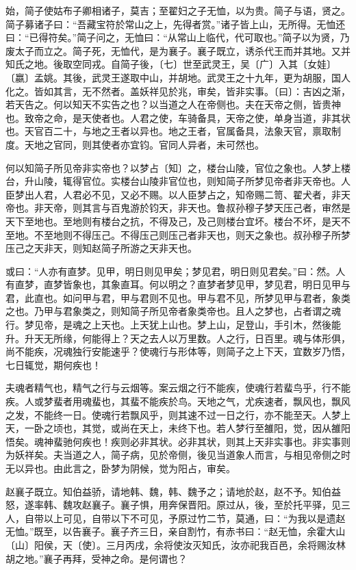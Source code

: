 \documentclass[]{article}
\begin{document}
始，简子使姑布子卿相诸子，莫吉；至翟妇之子无恤，以为贵。简子与语，贤之。简子募诸子曰：``吾藏宝符於常山之上，先得者赏。''诸子皆上山，无所得。无恤还曰：``已得符矣。''简子问之，无恤曰：``从常山上临代，代可取也。''简子以为贤，乃废太子而立之。简子死，无恤代，是为襄子。襄子既立，诱杀代王而并其地。又并知氏之地。後取空同戎。自简子後，〔七〕世至武灵王，吴〔广〕入其〔女娃〕〔嬴〕孟姚。其後，武灵王遂取中山，并胡地。武灵王之十九年，更为胡服，国人化之。皆如其言，无不然者。盖妖祥见於兆，审矣，皆非实事。〔曰〕：吉凶之渐，若天告之。何以知天不实告之也？以当道之人在帝侧也。夫在天帝之侧，皆贵神也。致帝之命，是天使者也。人君之使，车骑备具，天帝之使，单身当道，非其状也。天官百二十，与地之王者以异也。地之王者，官属备具，法象天官，禀取制度。天地之官同，则其使者亦宜钧。官同人异者，未可然也。

何以知简子所见帝非实帝也？以梦占〔知〕之，楼台山陵，官位之象也。人梦上楼台，升山陵，辄得官位。实楼台山陵非官位也，则知简子所梦见帝者非天帝也。人臣梦出人君，人君必不见，又必不赐。以人臣梦占之，知帝赐二笥、翟犬者，非天帝也。非天帝，则其言与百鬼游於钧天，非天也。鲁叔孙穆子梦天压己者，审然是天下至地也。至地则有楼台之抗，不得及己，及己则楼台宜坏。楼台不坏，是天不至地。不至地则不得压己。不得压己则压己者非天也，则天之象也。叔孙穆子所梦压己之天非天，则知赵简子所游之天非天也。

或曰：``人亦有直梦。见甲，明日则见甲矣；梦见君，明日则见君矣。''曰：然。人有直梦，直梦皆象也，其象直耳。何以明之？直梦者梦见甲，梦见君，明日见甲与君，此直也。如问甲与君，甲与君则不见也。甲与君不见，所梦见甲与君者，象类之也。乃甲与君象类之，则知简子所见帝者象类帝也。且人之梦也，占者谓之魂行。梦见帝，是魂之上天也。上天犹上山也。梦上山，足登山，手引木，然後能升。升天无所缘，何能得上？天之去人以万里数。人之行，日百里。魂与体形俱，尚不能疾，况魂独行安能速乎？使魂行与形体等，则简子之上下天，宜数岁乃悟，七日辄觉，期何疾也！

夫魂者精气也，精气之行与云烟等。案云烟之行不能疾，使魂行若蜚鸟乎，行不能疾。人或梦蜚者用魂蜚也，其蜚不能疾於鸟。天地之气，尤疾速者，飘风也，飘风之发，不能终一日。使魂行若飘风乎，则其速不过一日之行，亦不能至天。人梦上天，一卧之顷也，其觉，或尚在天上，未终下也。若人梦行至雒阳，觉，因从雒阳悟矣。魂神蜚驰何疾也！疾则必非其状。必非其状，则其上天非实事也。非实事则为妖祥矣。夫当道之人，简子病，见於帝侧，後见当道象人而言，与相见帝侧之时无以异也。由此言之，卧梦为阴候，觉为阳占，审矣。

赵襄子既立。知伯益骄，请地韩、魏，韩、魏予之；请地於赵，赵不予。知伯益怒，遂率韩、魏攻赵襄子。襄子惧，用奔保晋阳。原过从，後，至於托平驿，见三人，自带以上可见，自带以下不可见，予原过竹二节，莫通，曰：``为我以是遗赵无恤。''既至，以告襄子。襄子齐三日，亲自割竹，有赤书曰：``赵无恤，余霍大山〔山〕阳侯，天〔使〕。三月丙戌，余将使汝灭知氏，汝亦祀我百邑，余将赐汝林胡之地。''襄子再拜，受神之命。是何谓也？
\end{document}
